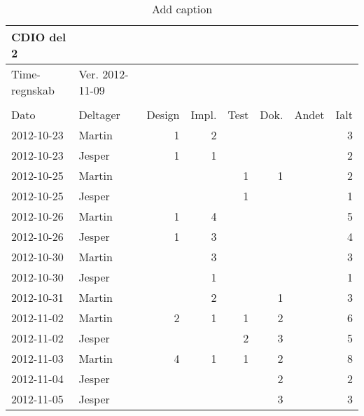 \begin{table}[htbp]
  \centering
  \caption{Add caption}
    \begin{tabular}{|l|l|r|r|r|r|r|r|}
    \hline
    CDIO del 2 &       &       &       &       &       &       &  \bigstrut\\
    \hline
    Time-regnskab & Ver. 2012-11-09 &       &       &       &       &       &  \bigstrut\\
    \hline
          &       &       &       &       &       &       &  \bigstrut\\
    \hline
    Dato  & Deltager & Design & Impl. & Test  & Dok.  & Andet & Ialt \bigstrut\\
    \hline
    2012-10-23 & Martin & 1     & 2     &       &       &       & 3 \bigstrut\\
    \hline
    2012-10-23 & Jesper & 1     & 1     &       &       &       & 2 \bigstrut\\
    \hline
    2012-10-25 & Martin &       &       & 1     & 1     &       & 2 \bigstrut\\
    \hline
    2012-10-25 & Jesper &       &       & 1     &       &       & 1 \bigstrut\\
    \hline
    2012-10-26 & Martin & 1     & 4     &       &       &       & 5 \bigstrut\\
    \hline
    2012-10-26 & Jesper & 1     & 3     &       &       &       & 4 \bigstrut\\
    \hline
    2012-10-30 & Martin &       & 3     &       &       &       & 3 \bigstrut\\
    \hline
    2012-10-30 & Jesper &       & 1     &       &       &       & 1 \bigstrut\\
    \hline
    2012-10-31 & Martin &       & 2     &       & 1     &       & 3 \bigstrut\\
    \hline
    2012-11-02 & Martin & 2     & 1     & 1     & 2     &       & 6 \bigstrut\\
    \hline
    2012-11-02 & Jesper &       &       & 2     & 3     &       & 5 \bigstrut\\
    \hline
    2012-11-03 & Martin & 4     & 1     & 1     & 2     &       & 8 \bigstrut\\
    \hline
    2012-11-04 & Jesper &       &       &       & 2     &       & 2 \bigstrut\\
    \hline
    2012-11-05 & Jesper &       &       &       & 3     &       & 3 \bigstrut\\
    \hline

\end{tabular}
\end{table}
